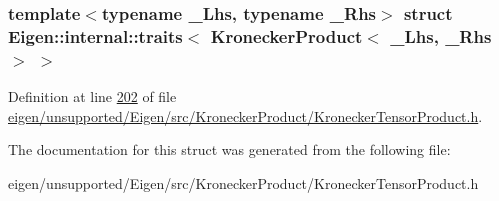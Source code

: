 \subsubsection*{template$<$typename \+\_\+\+Lhs, typename \+\_\+\+Rhs$>$\newline
struct Eigen\+::internal\+::traits$<$ Kronecker\+Product$<$ \+\_\+\+Lhs, \+\_\+\+Rhs $>$ $>$}



Definition at line \hyperlink{eigen_2unsupported_2_eigen_2src_2_kronecker_product_2_kronecker_tensor_product_8h_source_l00202}{202} of file \hyperlink{eigen_2unsupported_2_eigen_2src_2_kronecker_product_2_kronecker_tensor_product_8h_source}{eigen/unsupported/\+Eigen/src/\+Kronecker\+Product/\+Kronecker\+Tensor\+Product.\+h}.



The documentation for this struct was generated from the following file\+:\begin{DoxyCompactItemize}
\item 
eigen/unsupported/\+Eigen/src/\+Kronecker\+Product/\+Kronecker\+Tensor\+Product.\+h\end{DoxyCompactItemize}
